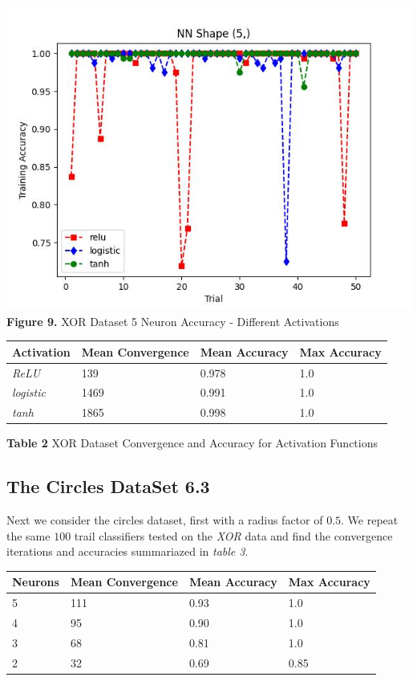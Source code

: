 \documentclass[11pt]{article}
\begin{document}
\includegraphics{figures/xor_5_activation_acc.jpg}\\
\textbf{Figure 9.} XOR Dataset 5 Neuron Accuracy - Different Activations

\begin{longtable}[]{@{}llll@{}}
\toprule
Activation & Mean Convergence & Mean Accuracy & Max Accuracy \\
\midrule
\endhead
\emph{ReLU} & 139 & 0.978 & 1.0 \\
\emph{logistic} & 1469 & 0.991 & 1.0 \\
\emph{tanh} & 1865 & 0.998 & 1.0 \\
\bottomrule
\end{longtable}

\textbf{Table 2} XOR Dataset Convergence and Accuracy for Activation
Functions

    \hypertarget{the-circles-dataset-6.3}{%
\subsection{The Circles DataSet 6.3}\label{the-circles-dataset-6.3}}

Next we consider the circles dataset, first with a radius factor of
\(0.5\). We repeat the same \(100\) trail classifiers tested on the
\emph{XOR} data and find the convergence iterations and accuracies
summariazed in \emph{table 3}.

\begin{longtable}[]{@{}llll@{}}
\toprule
Neurons & Mean Convergence & Mean Accuracy & Max Accuracy \\
\midrule
\endhead
5 & 111 & 0.93 & 1.0 \\
4 & 95 & 0.90 & 1.0 \\
3 & 68 & 0.81 & 1.0 \\
2 & 32 & 0.69 & 0.85 \\
\bottomrule
\end{longtable}
\end{document}
